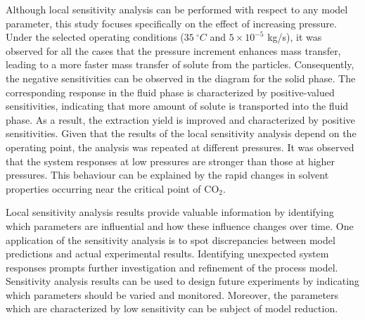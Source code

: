 \documentclass[a4paper,fleqn]{cas-dc}
\begin{document}

{\color{blue}Although local sensitivity analysis can be performed with respect to any model parameter, this study focuses specifically on the effect of increasing pressure. Under the selected operating conditions ($35~^\circ C$ and $5 \times 10^{-5}$ kg/s), it was observed for all the cases that the pressure increment enhances mass transfer, leading to a more faster mass transfer of solute from the particles. Consequently, the negative sensitivities can be observed in the diagram for the solid phase. The corresponding response in the fluid phase is characterized by positive-valued sensitivities, indicating that more amount of solute is transported into the fluid phase. As a result, the extraction yield is improved and characterized by positive sensitivities. Given that the results of the local sensitivity analysis depend on the operating point, the analysis was repeated at different pressures. It was observed that the system responses at low pressures are stronger than those at higher pressures. This behaviour can be explained by the rapid changes in solvent properties occurring near the critical point of CO$_2$}.

Local sensitivity analysis results provide valuable information by identifying which parameters are influential and how these influence changes over time. One application of the sensitivity analysis is to spot discrepancies between model predictions and actual experimental results. Identifying unexpected system responses prompts further investigation and refinement of the process model. Sensitivity analysis results can be used to design future experiments by indicating which parameters should be varied and monitored. Moreover, the parameters which are characterized by low sensitivity can be subject of model reduction. 
\end{document}
